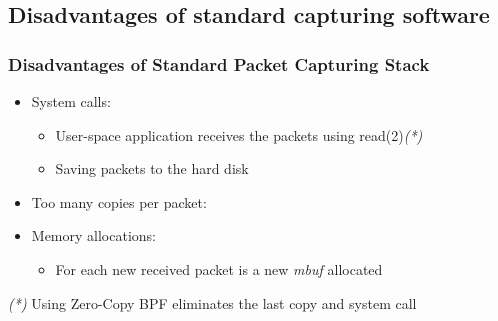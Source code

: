 \subsection*{Disadvantages of standard capturing software}
\begin{frame}
\frametitle{Disadvantages of Standard Packet Capturing Stack}
\begin{itemize}
	\item<1-> System calls:
		\begin{itemize}
			\item<1-> User-space application receives the packets using read(2)\emph{(*)}
			\item<1-> Saving packets to the hard disk\newline
		\end{itemize}
	\item<2-> Too many copies per packet:
		\begin{itemize}
		\end{itemize}
	\item<3-> Memory allocations:
		\begin{itemize}
			\item<3-> For each new received packet is a new \emph{mbuf} 
				allocated\newline
		\end{itemize}
\end{itemize}
\begin{tiny}
\emph{(*)} Using Zero-Copy BPF eliminates the last copy and system call
\end{tiny}
\end{frame}
